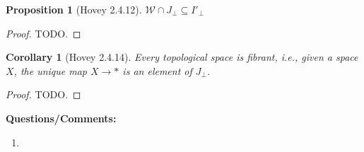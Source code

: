 \documentclass{amsart}
\theoremstyle{plain}
\newtheorem{corollary}[theorem]{Corollary}
\newtheorem{proposition}[theorem]{Proposition}
\theoremstyle{definition}
\newcommand{\sseq}{\subseteq}
\newcommand{\0}{\mathbf{0}}
\newcommand{\p}{{_\perp}}
\newcommand{\cW}{\mathcal W}
\renewcommand{\(}{\left(}
\renewcommand{\)}{\right)}
\begin{document}
\begin{proposition}[Hovey 2.4.12]\label{2.4.12}
  $\cW\cap J\p\sseq I'\p $
\end{proposition}
\begin{proof}
  \color{red}TODO.
\end{proof}

\begin{corollary}[Hovey 2.4.14]\label{2.4.14}
  Every topological space is fibrant, i.e., given a space $X$, the unique map $X\to\ast$ is an element of $J\p$.
\end{corollary}
\begin{proof}
  \color{red}TODO.
\end{proof}

\textbf{Questions/Comments:}\begin{enumerate}
  \item 
\end{enumerate}
\end{document}
